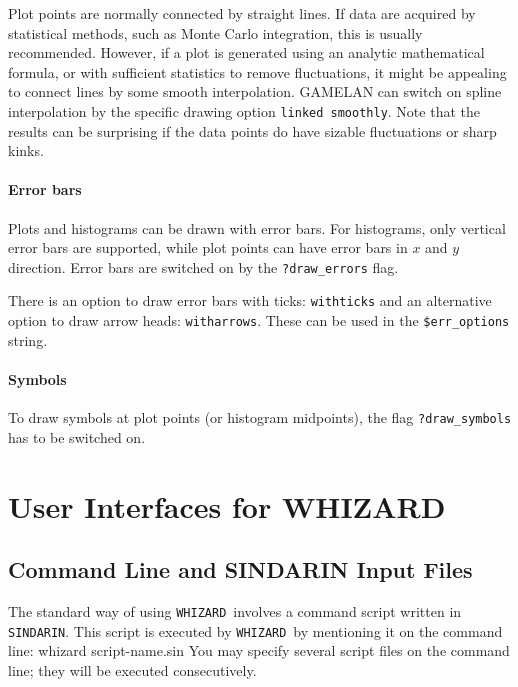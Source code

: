 \documentclass[12pt]{book}
\newenvironment{interaction}%
  {\begingroup\small
   \verbatim}%
  {\endverbatim
   \endgroup\noindent}
\newcommand{\ttt}[1]{\texttt{#1}}
\newcommand{\whizard}{\texttt{WHIZARD}}
\newcommand{\sindarin}{\texttt{SINDARIN}}
\begin{document}
Plot points are normally connected by straight lines.  If data are acquired by
statistical methods, such as Monte Carlo integration, this is usually
recommended.  However, if a plot is generated using an analytic mathematical
formula, or with sufficient statistics to remove fluctuations, it might be
appealing to connect lines by some smooth interpolation.  GAMELAN can switch
on spline interpolation by the specific drawing option \ttt{linked smoothly}.
Note that the results can be surprising if the data points do have sizable
fluctuations or sharp kinks.


\subsubsection{Error bars}

Plots and histograms can be drawn with error bars.  For histograms, only
vertical error bars are supported, while plot points can have error bars in
$x$ and $y$ direction.  Error bars are switched on by the \ttt{?draw\_errors}
flag.

There is an option to draw error bars with ticks: \ttt{withticks} and an
alternative option to draw arrow heads: \ttt{witharrows}.  These can be used
in the \ttt{\$err\_options} string.


\subsubsection{Symbols}

To draw symbols at plot points (or histogram midpoints), the flag
\ttt{?draw\_symbols} has to be switched on.




\chapter{User Interfaces for WHIZARD}
\label{chap:userint}

\section{Command Line and SINDARIN Input Files}
\label{sec:cmdline-options}

The standard way of using \whizard\ involves a command script written
in \sindarin.  This script is executed by \whizard\ by mentioning it
on the command line:
\begin{interaction}
  whizard script-name.sin
\end{interaction}
You may specify several script files on the command line; they will be
executed consecutively.
\end{document}
